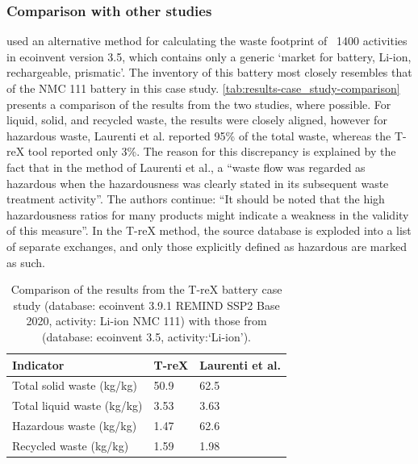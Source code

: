 \subsubsection{Comparison with other studies}\label{sec:results-case_study-comparison}

\cite{laurenti2023wastefootprint} used an alternative method for calculating the waste footprint of ~1400 activities in ecoinvent version 3.5, which contains only a generic `market for battery, Li-ion, rechargeable, prismatic'. The inventory of this battery most closely resembles that of the NMC 111 battery in this case study. \autoref{tab:results-case_study-comparison} presents a comparison of the results from the two studies, where possible. For liquid, solid, and recycled waste, the results were closely aligned, however for hazardous waste, Laurenti et al. reported 95\% of the total waste, whereas the T-reX tool reported only 3\%. The reason for this discrepancy is explained by the fact that in the method of Laurenti et al., a ``waste flow was regarded as hazardous when the hazardousness
was clearly stated in its subsequent waste treatment activity''. The authors continue: ``It should be noted that the high hazardousness ratios for many products might indicate a weakness in the validity of this measure''. In the T-reX method, the source database is exploded into a list of separate exchanges, and only those explicitly defined as hazardous are marked as such.

\begin{table}[H]
\centering
\caption{Comparison of the results from the T-reX battery case study (database: ecoinvent 3.9.1 REMIND SSP2 Base 2020, activity: Li-ion NMC 111) with those from \cite{laurenti2023wastefootprint} (database: ecoinvent 3.5, activity:`Li-ion').}
\label{tab:results-case_study-comparison}
\begin{tabular}{lll}
\toprule
\textbf{Indicator} & \textbf{T-reX} & \textbf{Laurenti et al.} \\
\midrule
Total solid waste (kg/kg)& 50.9 & 62.5 \\
Total liquid waste (kg/kg) & 3.53 & 3.63 \\
Hazardous waste (kg/kg) & 1.47 & 62.6 \\
Recycled waste (kg/kg) & 1.59 & 1.98 \\
\bottomrule
\end{tabular}
\end{table}

